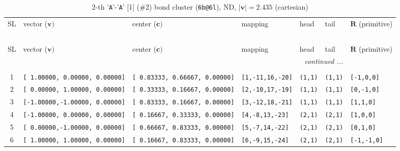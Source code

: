 \documentclass[fleqn,10pt,landscape]{jsarticle}
\begin{document}
\begin{longtable}[l]{cllllll}
\captionsetup{justification=raggedright, singlelinecheck=off}
\caption{2-th '\texttt{A}'-'\texttt{A}' [1] (\#2) bond cluster (\texttt{6b@6l}), ND, $|\bm{v}|=2.435$ (cartesian)}
 \\
 \hline \hline
SL & vector ($\bm{v})$ & center ($\bm{c})$ & mapping & head & tail & $\bm{R}$ (primitive) \\ \hline \endfirsthead

\multicolumn{6}{l}{\tablename\ \thetable{}} \\
 \hline \hline
SL & vector ($\bm{v})$ & center ($\bm{c})$ & mapping & head & tail & $\bm{R}$ (primitive) \\ \hline \endhead

 \hline \hline
\multicolumn{6}{r}{\footnotesize\it continued ...} \\ \endfoot

 \hline \hline
\multicolumn{6}{r}{} \\ \endlastfoot

1 & \texttt{[ 1.00000, 0.00000, 0.00000]} & \texttt{[ 0.83333, 0.66667, 0.00000]} & \texttt{[1,-11,16,-20]} & \texttt{(1,1)} & \texttt{(1,1)} & \texttt{[-1,0,0]} \\ \hline
2 & \texttt{[ 0.00000, 1.00000, 0.00000]} & \texttt{[ 0.33333, 0.16667, 0.00000]} & \texttt{[2,-10,17,-19]} & \texttt{(1,1)} & \texttt{(1,1)} & \texttt{[0,-1,0]} \\ \hline
3 & \texttt{[-1.00000,-1.00000, 0.00000]} & \texttt{[ 0.83333, 0.16667, 0.00000]} & \texttt{[3,-12,18,-21]} & \texttt{(1,1)} & \texttt{(1,1)} & \texttt{[1,1,0]} \\ \hline
4 & \texttt{[-1.00000, 0.00000, 0.00000]} & \texttt{[ 0.16667, 0.33333, 0.00000]} & \texttt{[4,-8,13,-23]} & \texttt{(2,1)} & \texttt{(2,1)} & \texttt{[1,0,0]} \\ \hline
5 & \texttt{[ 0.00000,-1.00000, 0.00000]} & \texttt{[ 0.66667, 0.83333, 0.00000]} & \texttt{[5,-7,14,-22]} & \texttt{(2,1)} & \texttt{(2,1)} & \texttt{[0,1,0]} \\ \hline
6 & \texttt{[ 1.00000, 1.00000, 0.00000]} & \texttt{[ 0.16667, 0.83333, 0.00000]} & \texttt{[6,-9,15,-24]} & \texttt{(2,1)} & \texttt{(2,1)} & \texttt{[-1,-1,0]} \\
\end{longtable}
\renewcommand{\arraystretch}{1.6}
\end{document}
